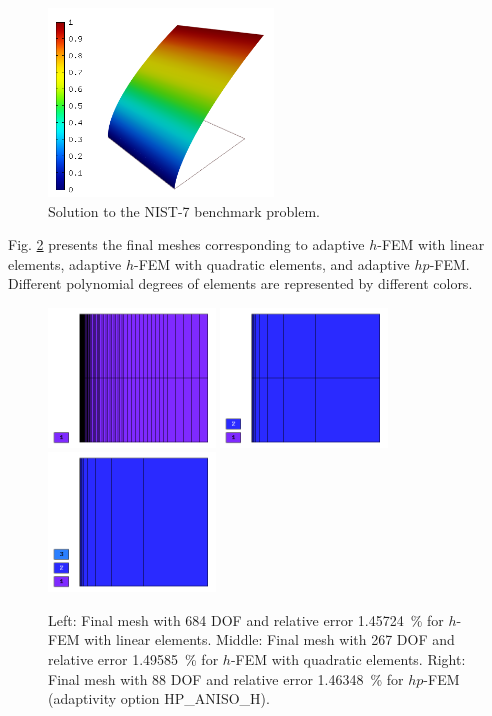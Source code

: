 \documentclass[12pt]{elsarticle}
\begin{document}
\begin{figure}[H]
\centering
\includegraphics[height=5cm]{nist/nist-7/solution.png}
\vspace{-3mm}
\caption{Solution to the NIST-7 benchmark problem.}
\label{fig:sln-nist07}
\end{figure}

Fig. \ref{fig:nist-7-hp-aniso} presents the final meshes corresponding to adaptive $h$-FEM with
linear elements, adaptive $h$-FEM with quadratic elements, and adaptive $hp$-FEM. Different
polynomial degrees of elements are represented by different colors.

\begin{figure}[H]
\centering
\vspace{-5mm}
\includegraphics[height=3.7cm]{nist/nist-7/mesh_h1_aniso.png}
\includegraphics[height=3.7cm]{nist/nist-7/mesh_h2_aniso.png}
\includegraphics[height=3.7cm]{nist/nist-7/mesh_hp_aniso.png}
\vspace{-3mm}
\caption{
Left: Final mesh with 684 DOF and relative error 1.45724~\% for $h$-FEM with linear elements.
Middle: Final mesh with 267 DOF and relative error 1.49585~\% for $h$-FEM with quadratic elements.
Right: Final mesh with 88 DOF and relative error 1.46348~\% for $hp$-FEM (adaptivity option HP\_ANISO\_H).}
\vspace{-3mm}
\label{fig:nist-7-hp-aniso}
\end{figure}
\end{document}
